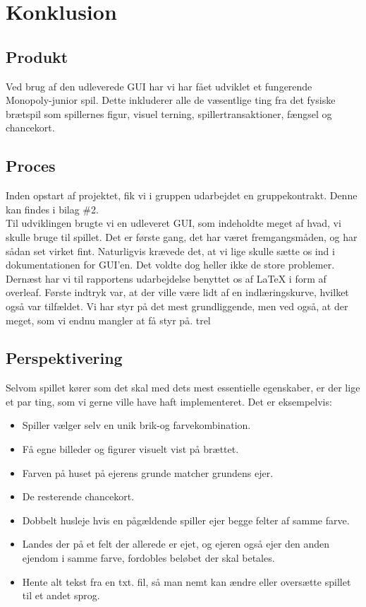 \section{Konklusion}
\subsection{Produkt}
Ved brug af den udleverede GUI har vi har fået udviklet et fungerende Monopoly-junior spil. Dette inkluderer alle de væsentlige ting fra det fysiske brætspil som spillernes figur, visuel terning, spillertransaktioner, fængsel og chancekort.

\subsection{Proces}
Inden opstart af projektet, fik vi i gruppen udarbejdet en gruppekontrakt. Denne kan findes i bilag \#2.
\\Til udviklingen brugte vi en udleveret GUI, som indeholdte meget af hvad, vi skulle bruge til spillet. Det er første gang, det har været fremgangsmåden, og har sådan set virket fint. Naturligvis krævede det, at vi lige skulle sætte os ind i dokumentationen for GUI'en. Det voldte dog heller ikke de store problemer.
\\
Dernæst har vi til rapportens udarbejdelse benyttet os af LaTeX i form af overleaf. Første indtryk var, at der ville være lidt af en indlæringskurve, hvilket også var tilfældet. Vi har styr på det mest grundliggende, men ved også, at der meget, som vi endnu mangler at få styr på. 
trel
\subsection{Perspektivering}
Selvom spillet kører som det skal med dets mest essentielle egenskaber, er der lige et par ting, som vi gerne ville have haft implementeret. Det er eksempelvis:
\begin{itemize}
\item Spiller vælger selv en unik brik-og farvekombination.
\item Få egne billeder og figurer visuelt vist på brættet.
\item Farven på huset på ejerens grunde matcher grundens ejer.
\item De resterende chancekort.
\item Dobbelt husleje hvis en pågældende spiller ejer begge felter af samme farve.
\item Landes der på et felt der allerede er ejet, og ejeren også ejer den anden ejendom i samme farve, fordobles beløbet der skal betales.
\item Hente alt tekst fra en txt. fil, så man nemt kan ændre eller oversætte spillet til et andet sprog.
\end{itemize}
